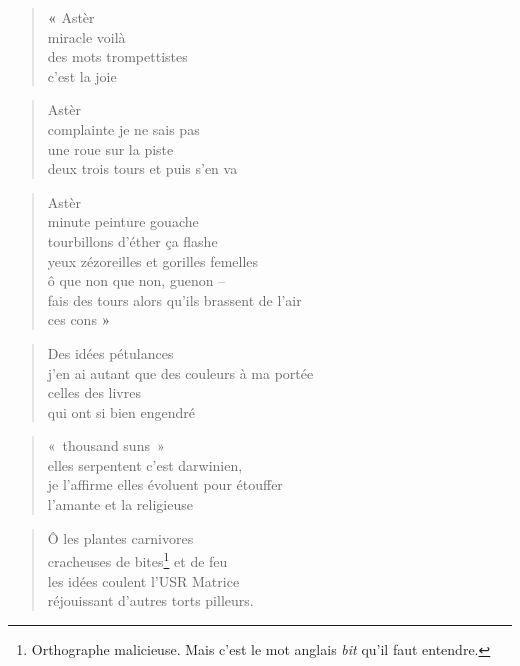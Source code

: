 \newpage
{}
  \begin{verse}
    {\Huge \textbf{«}} Astèr\\
    miracle voilà\\
    des mots trompettistes\\
    c’est la joie
  \end{verse}
  \begin{verse}
    Astèr\\
    complainte je ne sais pas\\
    une roue sur la piste\\
    deux trois tours et puis s’en va
  \end{verse}
  \begin{verse}
    Astèr\\
    minute peinture gouache\\
    tourbillons d’éther ça flashe\\
    yeux zézoreilles et gorilles femelles\\
    ô que non que non, guenon --\\
    fais des tours alors qu’ils brassent de l’air\\
    ces cons {\Huge \textbf{»}}
  \end{verse}

  \begin{verse}
    Des idées pétulances\\
    j’en ai autant que des couleurs à ma portée\\
    celles des livres\\
    qui ont si bien engendré
  \end{verse}
  \begin{verse}
    «~thousand suns~»\\
    elles serpentent c’est darwinien,\\
    je l’affirme elles évoluent pour étouffer\\
    l’amante et la religieuse
  \end{verse}
  \begin{verse}
    Ô les plantes carnivores\\
    cracheuses de bites\footnote{Orthographe malicieuse. Mais c’est le mot anglais \textit{bit} qu’il faut entendre.} et de feu\\
    les idées coulent l’USR Matrice\\
    réjouissant d’autres torts pilleurs.
  \end{verse}

